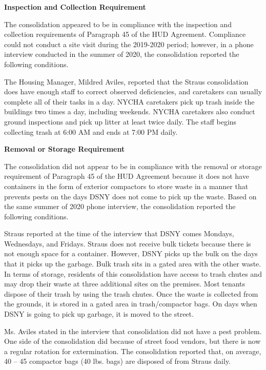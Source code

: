  

\textbf{Inspection and Collection Requirement} 

 

The consolidation appeared to be in compliance with the inspection and collection requirements of Paragraph 45 of the HUD Agreement. Compliance could not conduct a site visit during the 2019-2020 period; however, in a phone interview conducted in the summer of 2020, the consolidation reported the following conditions.

The Housing Manager, Mildred Aviles, reported that the Straus consolidation does have enough staff to correct observed deficiencies, and caretakers can usually complete all of their tasks in a day. NYCHA caretakers pick up trash inside the buildings two times a day, including weekends. NYCHA caretakers also conduct ground inspections and pick up litter at least twice daily. The staff begins collecting trash at 6:00 AM and ends at 7:00 PM daily. 

\textbf{Removal or Storage Requirement} 

The consolidation did not appear to be in compliance with the removal or storage requirement of Paragraph  45 of the HUD Agreement because it does not have containers in the form of exterior compactors to store waste in a manner that prevents pests on the days DSNY does not come to pick up the waste. Based on the same summer of  2020  phone interview, the consolidation reported the following conditions.

  

Straus reported at the time of the interview that DSNY comes Mondays, Wednesdays, and Fridays. Straus does not receive bulk tickets because there is not enough space for a container. However, DSNY picks up the bulk on the days that it picks up the garbage. Bulk trash sits in a gated area with the other waste. In terms of storage, residents of this consolidation have access to trash chutes and may drop their waste at three additional sites on the premises. Most tenants dispose of their trash by using the trash chutes. Once the waste is collected from the grounds, it is stored in a gated area in trash/compactor bags. On days when DSNY is going to pick up garbage, it is moved to the street.

Ms. Aviles stated in the interview that consolidation did not have a pest problem. One side of the consolidation did because of street food vendors, but there is now a regular rotation for extermination. The consolidation reported that, on average, 40 -- 45 compactor bags (40 lbs. bags)  are disposed of from Straus daily.

